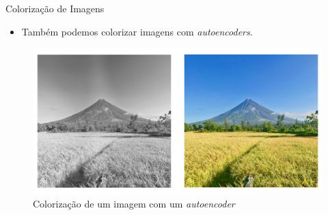 \documentclass[dvipsnames]{beamer}
\begin{document}
\begin{frame}{Colorização de Imagens}

    \begin{itemize}
        \item Também podemos colorizar imagens com \emph{autoencoders}.
    \end{itemize}
   
    \begin{figure}
        \centering
        \includegraphics[scale=0.2]{img/coloring.png}
        \caption{Colorização de um imagem com um \emph{autoencoder}}
    \end{figure}
\end{frame}
\end{document}
